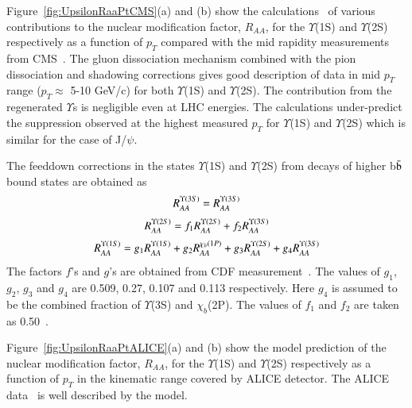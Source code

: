 {Figure~\ref{fig:UpsilonRaaPtCMS}(a) and (b) show the calculations~\cite{Kumar:2019xdj}
of various contributions to
the nuclear modification factor, $R_{AA}$, for the $\Upsilon$(1S) and $\Upsilon$(2S)
respectively as a function of $p_T$ compared with the mid rapidity measurements from
CMS~\cite{Sirunyan:2018nsz}.  
The gluon dissociation mechanism combined with the pion dissociation and shadowing
corrections gives good description of data in mid $p_{T}$ range ($p_{T}\approx$ 5-10 GeV/c)
for both $\Upsilon$(1S) and $\Upsilon$(2S).
The contribution from the regenerated $\Upsilon$s is negligible even at LHC energies.
The calculations under-predict the suppression observed at the highest measured
$p_{T}$ for $\Upsilon$(1S) and $\Upsilon$(2S) which is similar for the case
of J/$\psi$.

The feeddown corrections in the states $\Upsilon$(1S) and $\Upsilon$(2S) 
from decays of higher b$\bar{\rm b}$ bound states are obtained as
  \begin{equation}
    R_{AA}^{\Upsilon(3S)} = R_{AA}^{\Upsilon(3S)}\\ %
  \end{equation}
  \begin{equation}
    R_{AA}^{\Upsilon(2S)} = f_1 R_{AA}^{\Upsilon(2S)} +  f_2 R_{AA}^{\Upsilon(3S)} \\ %
  \end{equation}
   \begin{equation}
    R_{AA}^{\Upsilon(1S)} = g_1 R_{AA}^{\Upsilon(1S)} +  g_2 R_{AA}^{\chi_b(1P)} + g_3 R_{AA}^{\Upsilon(2S)} + g_4 R_{AA}^{\Upsilon(3S)}\\ %
  \end{equation}
The factors $f$'s and $g$'s are obtained from CDF measurement~\cite{Affolder:1999wm}.
The values of $g_1$, $g_2$, $g_3$ and $g_4$ are 0.509, 0.27, 0.107
and 0.113 respectively. Here $g_4$ is assumed to be the combined fraction of 
$\Upsilon$(3S) and $\chi_b$(2P).
The values of $f_1$ and $f_2$ are taken as 0.50~\cite{Strickland:2011aa}.


Figure~\ref{fig:UpsilonRaaPtALICE}(a) and (b) show the model 
prediction \cite{Kumar:2019xdj} of the nuclear modification factor, $R_{AA}$, for the $\Upsilon$(1S)
and $\Upsilon$(2S) respectively as a function of $p_T$ in the kinematic range
covered by ALICE detector. The ALICE data~\cite{ALICE:2020wwx} is well described by the model.

}
